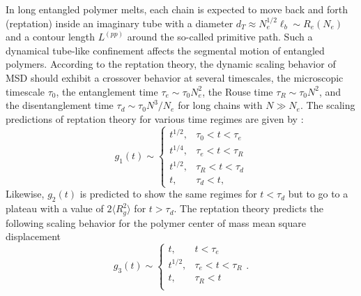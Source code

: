 \documentclass[pre,showpacs,notitlepage,twocolumn]{revtex4-1}
\begin{document}
  
  
  

 
  
  In long entangled polymer melts, each chain is expected to move
back and forth (reptation) inside an imaginary tube with  a diameter $d_T  \approx N_e^{1/2}  \ell_b  \sim   R_e (N_e)$  and a contour  
length $L^{(pp)}$ around the so-called primitive path. Such a dynamical tube-like confinement affects the segmental motion of entangled polymers.  According to the reptation theory,  the dynamic scaling behavior of MSD  should exhibit a crossover behavior at several
timescales, the microscopic timescale $\tau_0$, the entanglement time $\tau_e \sim \tau_0 N_e^2$, the Rouse time  $\tau_R \sim \tau_0 N^2$, and the disentanglement
time   $\tau_d \sim \tau_0 N^3/N_e$ for long chains with $N \gg N_e$. 
The  scaling predictions of reptation theory  for  various time regimes are given by \cite{polymerDoi,KGmodel}:
 \begin{equation}
    g_1(t) \sim
    \begin{cases}
      t^{1/2}, &  \tau_0< t < \tau_e \\
     t^{1/4}, &  \tau_e< t < \tau_R\\
     t^{1/2}, &  \tau_R< t < \tau_d \\
      t , &  \tau_d< t ,
       \end{cases}
       \label{eq:g1}
  \end{equation}
  Likewise, $ g_2(t)$  is predicted to show the same regimes for $t<\tau_d$ but to go to a plateau with a value of $2 \langle R_g^2 \rangle$ for $t>  \tau_d$.
  The reptation theory predicts the following scaling behavior for the polymer  center of mass  mean square displacement  
  \begin{equation}
    g_3(t) \sim
    \begin{cases}
      t, & t < \tau_e \\
      t^{1/2}, &  \tau_e< t < \tau_R\\
      t , &  \tau_R< t   \\
    \end{cases}.
     \label{eq:g3}
  \end{equation}
    
\end{document}
